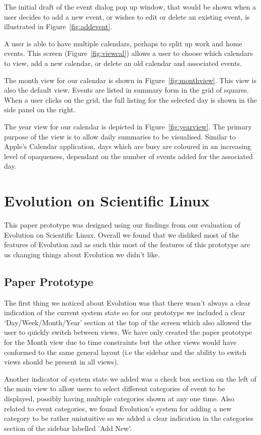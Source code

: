 \documentclass{article}
\begin{document}
The initial draft of the event dialog pop up window, that would be
shown when a user decides to add a new event, or wishes to edit or
delete an existing event, is illustrated in Figure~\ref{fig:addevent}.

A user is able to have multiple calendars, perhaps to split up work and
home events. This screen (Figure~\ref{fig:viewcal}) allows a user to
choose which calendars to view, add a new calendar, or delete an old
calendar and associated events.

The month view for our calendar is shown in Figure~\ref{fig:monthview}.
This view is also the default view. Events are listed in summary form
in the grid of squares. When a user clicks on the grid, the full listing
for the selected day is shown in the side panel on the right.

The year view for our calendar is depicted in Figure~\ref{fig:yearview}.
The primary purpose of the view is to allow daily summaries to be
visualised. Similar to Apple's Calendar application, days which are
busy are coloured in an increasing level of opaqueness, dependant on
the number of events added for the associated day.

\section{Evolution on Scientific Linux}

This paper prototype was designed using our findings from our evaluation 
of Evolution on Scientific Linux. Overall we found that we disliked most
of the features of Evolution and as such this most of the features of
this prototype are us changing things about Evolution we didn't like.

\subsection{Paper Prototype}

The first thing we noticed about Evolution was that there wasn't always
a clear indication of the current system state so for our prototype we
included a clear `Day/Week/Month/Year' section at the top of the screen
which also allowed the user to quickly switch between views. We have
only created the paper prototype for the Month view due to time
constraints but the other views would have conformed to the same general
layout (i.e the sidebar and the ability to switch views should be
present in all views).

Another indicator of system state we added was a check box section on
the left of the main view to allow users to select different categories
of event to be displayed, possibly having multiple categories shown at
any one time. Also related to event categories, we found Evolution's
system for adding a new category to be rather unintuitive so we added a
clear indication in the categories section of the sidebar labelled
'Add New'.
\end{document}
